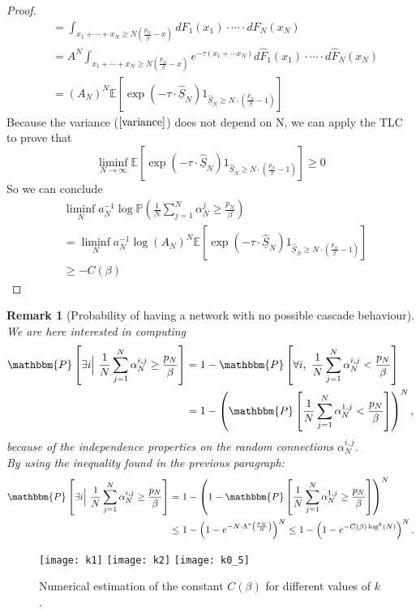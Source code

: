 \documentclass[11pt, a4paper]{article}
\newtheorem{remark}[theorem]{Remark}
\begin{document}
\begin{proof}
\begin{align*}
&=\int_{x_1+\cdots+x_N\geq N\left(\frac{p_N}{\beta}-x\right)} dF_1(x_1)\cdot\cdots\cdot dF_N(x_N)\\
&=A^N\int_{x_1+\cdots+x_N\geq N\left(\frac{p_N}{\beta}-x\right)}e^{-\tau (x_1+\cdots x_N)} d\hat{F}_1(x_1)\cdot\cdots\cdot d\hat{F}_N(x_N)\\
& = (A_N)^N\mathbb{E}\left[\exp(-\tau\cdot \underline{\hat{S}}_N)1_{\underline{\hat{S}}_N\geq N\cdot(\frac{p_N}{\beta}-1)}\right]
\end{align*}
Because the variance ($\ref{variance}$) does not depend on N, we can apply the TLC to prove that
\[\liminf_{N\rightarrow \infty}\mathbb{E}\left[\exp(-\tau\cdot \underline{\hat{S}}_N)1_{\underline{\hat{S}}_N\geq N\cdot(\frac{p_N}{\beta}-1)}\right]\geq 0\]
So we can conclude
\begin{align*}
&\liminf_{N} a_N^{-1}\log{\mathbb{P} \left( \frac{1}{N} \sum_{j = 1}^N \alpha^{j}_N \geq \frac{p_N}{\beta}\right)}\\
&=\liminf_{N} a_N^{-1}\log{(A_N)^N\mathbb{E}\left[\exp(-\tau\cdot \underline{\hat{S}}_N)1_{\underline{\hat{S}}_N\geq N\cdot(\frac{p_N}{\beta}-1)}\right]}\\
&\geq-C(\beta)
\end{align*}
\end{proof}


\begin{remark}[Probability of having a network with no possible cascade behaviour]

We are here interested in computing \begin{align*} \mathbbm{P} \left[ \exists i \Big| \ \frac{1}{N} \sum_{j = 1}^N \alpha^{i, j}_N \geq \frac{p_N}{\beta} \right] &= 1 - \mathbbm{P} \left[ \forall i, \ \frac{1}{N} \sum_{j = 1}^N \alpha^{i, j}_N < \frac{p_N}{\beta} \right] \\ &= 1 - \left( \mathbbm{P} \left[ \frac{1}{N} \sum_{j = 1}^N \alpha^{1, j}_N < \frac{p_N}{\beta} \right] \right)^N, \end{align*} because of the independence properties on the random connections $\alpha^{i, j}_N$. \\

By using the inequality found in the previous paragraph:
\begin{align*} \mathbbm{P} \left[ \exists i \Big| \ \frac{1}{N} \sum_{j = 1}^N \alpha^{i, j}_N \geq \frac{p_N}{\beta} \right] &= 1 - \left( 1 - \mathbbm{P} \left[ \frac{1}{N} \sum_{j = 1}^N \alpha^{1, j}_N \geq \frac{p_N}{\beta} \right] \right)^N \\ &\leq 1 - \left( 1 - e^{-N \cdot \Lambda^* \left( \frac{p_N}{N} \right)} \right)^N \leq 1 - \left( 1 - e^{-C(\beta) \log^k (N)} \right)^N. \end{align*}
\end{remark}

\begin{figure}
\subfigure
{\texttt{[image: k1]}}
\subfigure
{\texttt{[image: k2]}}
\centering
\subfigure
{\texttt{[image: k0\_5]}}
\caption{Numerical estimation of the constant $C(\beta)$ for different values of $k$.}
\end{figure}
\end{document}
